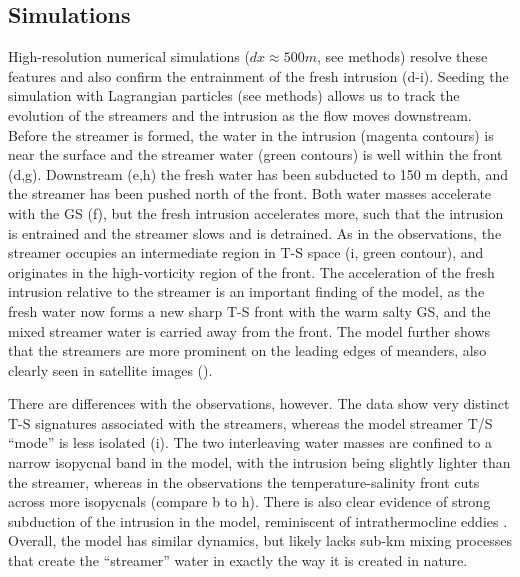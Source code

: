\documentclass[draft,grl]{agutex2015}
\begin{document}
\begin{article}

\section{Simulations}

High-resolution numerical simulations ($dx\approx 500 m$, see methods) resolve these features and also confirm the entrainment of the fresh intrusion (d-i). Seeding the simulation with Lagrangian particles (see methods) allows us to track the evolution of the streamers and the intrusion as the flow moves downstream.  Before the streamer is formed, the water in the intrusion (magenta contours) is near the surface and the streamer water (green contours) is well within the front (d,g).  Downstream (e,h) the fresh water has been subducted to 150 m depth, and the streamer has been pushed north of the front.  Both water masses accelerate with the  GS  (f), but the fresh intrusion accelerates more, such that the intrusion is entrained and the streamer slows and is detrained.  As in the observations, the streamer occupies an intermediate region in T-S space (i, green contour), and originates in the high-vorticity region of the front.   The acceleration of the fresh intrusion relative to the streamer is an important finding of the model, as the fresh water now forms a new sharp T-S front with the warm salty GS, and the  mixed streamer water is carried away from the front.  The model further shows that the streamers are more prominent on the leading edges of meanders, also clearly seen in satellite images ().  

There are differences with the observations, however.  The data show very distinct T-S signatures associated with the streamers, whereas the model streamer T/S ``mode'' is less isolated (i).  The two interleaving water masses are confined to a narrow isopycnal band in the model, with the intrusion being slightly lighter than the streamer, whereas in the observations the temperature-salinity front cuts across more isopycnals (compare b to h).   There is also clear evidence of strong subduction of the intrusion in the model, reminiscent of intrathermocline eddies \cite{thomasjoyce10}. Overall, the model has similar dynamics, but likely lacks sub-km mixing processes that create the ``streamer'' water in exactly the way it is created in nature.  


\end{article}
\end{document}
